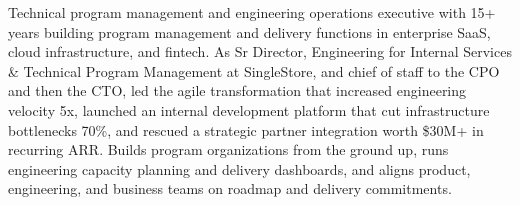 \documentclass[11pt,letterpaper,sans]{moderncv}
\begin{document}
\makecvtitle


\vspace{6pt}
\small{Technical program management and engineering operations executive with 15+ years building program management and delivery functions in enterprise SaaS, cloud infrastructure, and fintech. As Sr Director, Engineering for Internal Services \& Technical Program Management at SingleStore, and chief of staff to the CPO and then the CTO, led the agile transformation that increased engineering velocity 5x, launched an internal development platform that cut infrastructure bottlenecks 70\%, and rescued a strategic partner integration worth \$30M+ in recurring ARR. Builds program organizations from the ground up, runs engineering capacity planning and delivery dashboards, and aligns product, engineering, and business teams on roadmap and delivery commitments.}

\end{document}

